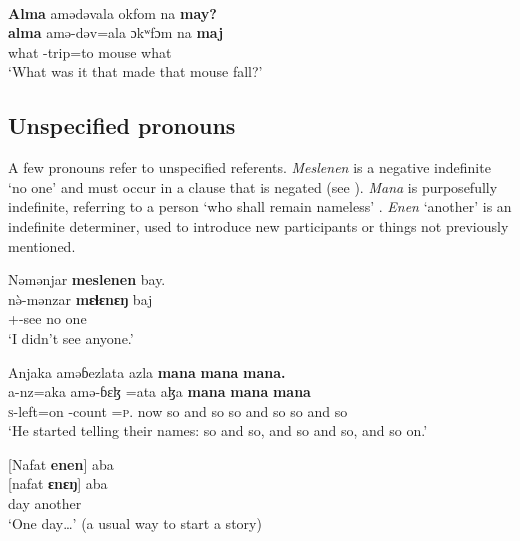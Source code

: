 \ea \label{ex:3:42}\\
\textbf{Alma}  amədəvala  okfom  na  \textbf{may?}\\
\gll  \textbf{alma}  amə-dəv=ala    ɔkʷfɔm  na  \textbf{maj}\\
      what  {\DEP}-trip=to    mouse  {\PSP}  what\\
\glt  ‘What was it that made that mouse fall?’
\z

\subsection{Unspecified pronouns}\label{sec:3.1.5}
\hypertarget{RefHeading1210921525720847}{}
A few pronouns refer to unspecified referents.  \textit{Meslenen} is a negative indefinite ‘no one’  and must occur in a clause that is negated (see ). \textit{Mana} is purposefully indefinite, referring to a person ‘who shall remain nameless’ .  \textit{ Enen} ‘another’  is an indefinite determiner, used to introduce new participants or things not previously mentioned.

\clearpage
\ea \label{ex:3:43}
Nəmənjar  \textbf{meslenen} bay.\\
\gll  n\`{ə}-mənzar     \textbf{mɛɬɛnɛŋ}    baj\\
      {\oneS}+{\PFV}-see    {no one}    {\NEG}\\
\glt  ‘I didn’t see anyone.’
\z

\ea \label{ex:3:44}
Anjaka  aməɓezlata  azla  \textbf{mana}  \textbf{mana}  \textbf{mana.}  \\
\gll  a-nz=aka  amə-ɓɛɮ    =ata   aɮa    \textbf{mana}    \textbf{mana}    \textbf{mana}  \\
      \textsc{s}-left=on  {\DEP}-count  =\textsc{p}.{\IO}  now  {so and so} {so and so} {so and so}\\
\glt  ‘He started telling their names: so and so, and so and so, and so on.’  
\z

\ea \label{ex:3:45}{}
{}[Nafat  \textbf{enen}] aba\\
\gll  {}[nafat  \textbf{ɛnɛŋ}]  aba\\
      day    another  {\EXT}\\
\glt  ‘One day\ldots’  (a usual way to start a story)
\z

